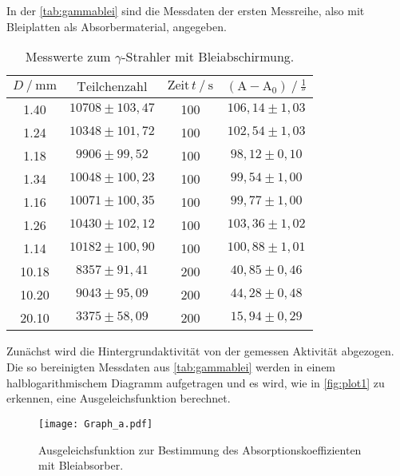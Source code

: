 In der \autoref{tab:gammablei} sind die Messdaten der ersten Messreihe, also mit Bleiplatten als Absorbermaterial, angegeben.
\begin{table}[H]
    \centering
    \caption{Messwerte zum $\gamma$-Strahler mit Bleiabschirmung.}
    \label{tab:gammablei}
    \begin{tabular}{S[table-format=2.2] S[table-format=5.0] S[table-format=3.0] S}
      \toprule
      {$D \mathbin{/} \unit{\milli\meter} $} & {$\text{Teilchenzahl}$} & {$\text{Zeit} \,t \mathbin{/} \unit{\second}$} &{$ \left(\text{A}- \text{A}_0 \right) \mathbin{/} \unit{\frac{1}{\second}}$} \\
         &{$ 10708 \pm  103,47  $}& 100 & {$106,14   \pm 1,03$}  \\
       1.24  & {$10348  \pm  101,72  $}& 100 & {$102,54   \pm 1,03$}  \\
       1.18  & {$ 9906  \pm  99,52  $}& 100 & {$ 98,12   \pm 0,10$}  \\
       1.34  & {$10048  \pm  100,23  $}& 100 & {$ 99,54   \pm 1,00$}  \\
       1.16  & {$10071  \pm  100,35  $}& 100 & {$ 99,77   \pm 1,00$}  \\
       1.26  & {$10430  \pm  102,12  $}& 100 & {$103,36   \pm 1,02$}  \\
       1.14  & {$10182  \pm  100,90  $}& 100 & {$100,88   \pm 1,01$}  \\
      10.18  & {$ 8357  \pm  91,41   $}& 200 & {$ 40,85   \pm 0,46$}  \\
      10.20  & {$ 9043  \pm  95,09   $}& 200 & {$ 44,28   \pm 0,48$}  \\
      20.10  & {$ 3375  \pm  58,09  $}& 200 & {$ 15,94   \pm 0,29$}  \\
      \bottomrule
    \end{tabular}
  \end{table}

Zunächst wird die Hintergrundaktivität von der gemessen Aktivität abgezogen.
Die so bereinigten Messdaten aus \autoref{tab:gammablei} werden in einem halblogarithmischem Diagramm aufgetragen und es wird, wie in \autoref{fig:plot1} zu erkennen, eine Ausgeleichsfunktion berechnet.

\begin{figure}[H]
    \centering
    \texttt{[image: Graph\_a.pdf]}
    \caption{Ausgeleichsfunktion zur Bestimmung des Absorptionskoeffizienten mit Bleiabsorber.}
    \label{fig:plot1}
  \end{figure}

